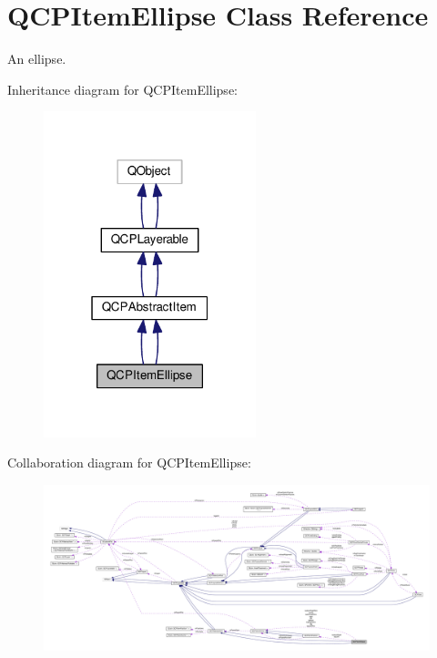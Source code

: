 \hypertarget{class_q_c_p_item_ellipse}{}\section{Q\+C\+P\+Item\+Ellipse Class Reference}
\label{class_q_c_p_item_ellipse}


An ellipse.  




Inheritance diagram for Q\+C\+P\+Item\+Ellipse\+:\nopagebreak
\begin{figure}[H]
\begin{center}
\leavevmode
\includegraphics[width=175pt]{class_q_c_p_item_ellipse__inherit__graph}
\end{center}
\end{figure}


Collaboration diagram for Q\+C\+P\+Item\+Ellipse\+:\nopagebreak
\begin{figure}[H]
\begin{center}
\leavevmode
\includegraphics[width=350pt]{class_q_c_p_item_ellipse__coll__graph}
\end{center}
\end{figure}
